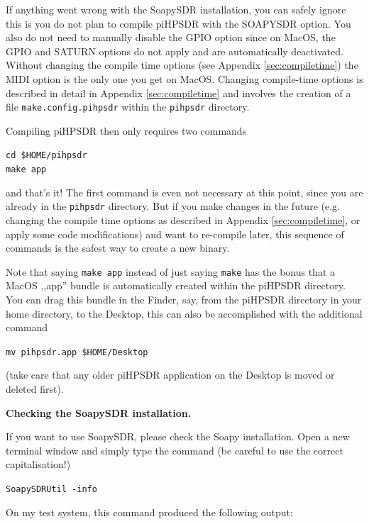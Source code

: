 \documentclass[12pt]{book}
\def\grtt#1{\texttt{\color{magenta}#1}}
\def\pH{pi\-HPSDR\xspace}
\begin{document}
If anything went wrong with the SoapySDR installation, you can safely ignore this is
you do not plan to compile \pH with the SOAPYSDR option. You also do not need
to manually disable the GPIO option since on MacOS, the GPIO and SATURN options
do not apply and are automatically deactivated. Without changing the compile time
options (see Appendix \ref{sec:compiletime}) the MIDI option is the only one you get
on MacOS. Changing compile-time options is described in detail in Appendix \ref{sec:compiletime}
and involves the creation of a file \texttt{make.config.pihpsdr} within the \texttt{pihpsdr}
directory.

Compiling \pH then only requires two commands

\grtt{cd \$HOME/pihpsdr} \\
\grtt{make app}

and that's it! The first command is even not necessary at this point,
since you are already in the \texttt{pihpsdr}  directory.
But if you make changes in the future (e.g. changing the compile time options as described in
Appendix \ref{sec:compiletime}, or apply some code modifications)
and want to re-compile later, this sequence of commands is the safest way to create a new binary.

Note that saying \texttt{make app} instead of just saying \texttt{make} has the bonus
that a MacOS ,,app'' bundle is automatically created within the \pH directory.
You can drag this bundle in the Finder, say, from the \pH directory in your
home directory, to the Desktop, this can also be accomplished with the additional command

\grtt{mv pihpsdr.app \$HOME/Desktop}

(take care that any older \pH application on the Desktop is moved or deleted first).

\clearpage
\textbf{Checking the SoapySDR installation.}

If you want to use SoapySDR, please check the Soapy installation.
Open a new terminal window and simply
type the command (be careful to use the correct capitalisation!)

\grtt{SoapySDRUtil -info}

On my test system, this command produced the following output:
\end{document}
